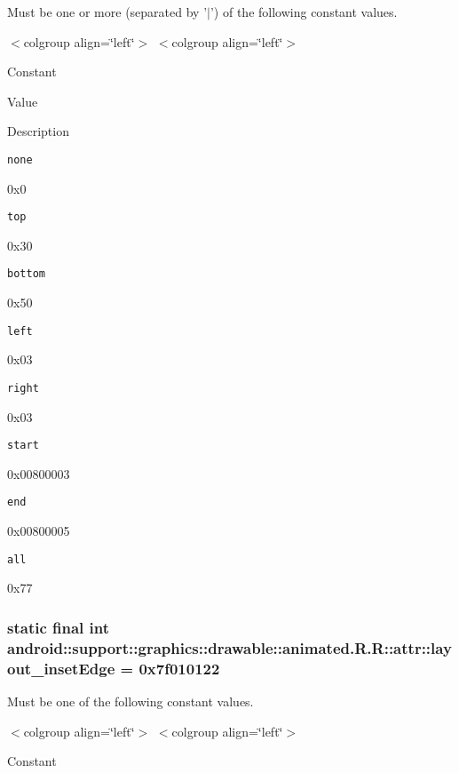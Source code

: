 Must be one or more (separated by '$|$') of the following constant values. \begin{TabularC}{0}
\hline
\end{TabularC}
$<$colgroup align=\char`\"{}left\char`\"{}$>$ $<$colgroup align=\char`\"{}left\char`\"{}$>$ 

Constant

Value

Description 

{\tt none}

0x0

{\tt top}

0x30

{\tt bottom}

0x50

{\tt left}

0x03

{\tt right}

0x03

{\tt start}

0x00800003

{\tt end}

0x00800005

{\tt all}

0x77\hypertarget{classandroid_1_1support_1_1graphics_1_1drawable_1_1animated_1_1_r_1_1attr_b91b5189a3d923139a00d46bed45aedd}{
\subsubsection[{layout\_\-insetEdge}]{\setlength{\rightskip}{0pt plus 5cm}static final int android::support::graphics::drawable::animated.R.R::attr::layout\_\-insetEdge = 0x7f010122}}
\label{classandroid_1_1support_1_1graphics_1_1drawable_1_1animated_1_1_r_1_1attr_b91b5189a3d923139a00d46bed45aedd}


Must be one of the following constant values. \begin{TabularC}{0}
\hline
\end{TabularC}
$<$colgroup align=\char`\"{}left\char`\"{}$>$ $<$colgroup align=\char`\"{}left\char`\"{}$>$ 

Constant

